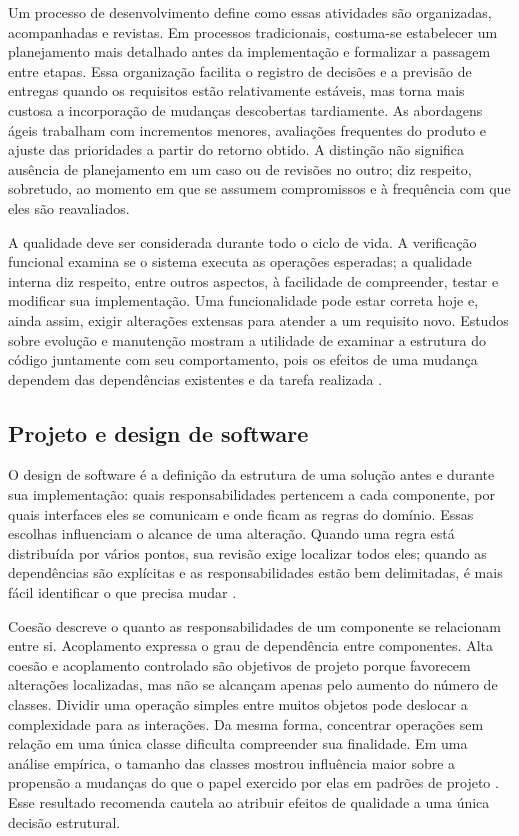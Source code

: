 \documentclass[12pt]{article}
\begin{document}
Um processo de desenvolvimento define como essas atividades são organizadas, acompanhadas e revistas. Em processos tradicionais, costuma-se estabelecer um planejamento mais detalhado antes da implementação e formalizar a passagem entre etapas. Essa organização facilita o registro de decisões e a previsão de entregas quando os requisitos estão relativamente estáveis, mas torna mais custosa a incorporação de mudanças descobertas tardiamente. As abordagens ágeis trabalham com incrementos menores, avaliações frequentes do produto e ajuste das prioridades a partir do retorno obtido. A distinção não significa ausência de planejamento em um caso ou de revisões no outro; diz respeito, sobretudo, ao momento em que se assumem compromissos e à frequência com que eles são reavaliados.

A qualidade deve ser considerada durante todo o ciclo de vida. A verificação funcional examina se o sistema executa as operações esperadas; a qualidade interna diz respeito, entre outros aspectos, à facilidade de compreender, testar e modificar sua implementação. Uma funcionalidade pode estar correta hoje e, ainda assim, exigir alterações extensas para atender a um requisito novo. Estudos sobre evolução e manutenção mostram a utilidade de examinar a estrutura do código juntamente com seu comportamento, pois os efeitos de uma mudança dependem das dependências existentes e da tarefa realizada \cite{prechelt2001,hsu2024}.

\subsection{Projeto e design de software}

O design de software é a definição da estrutura de uma solução antes e durante sua implementação: quais responsabilidades pertencem a cada componente, por quais interfaces eles se comunicam e onde ficam as regras do domínio. Essas escolhas influenciam o alcance de uma alteração. Quando uma regra está distribuída por vários pontos, sua revisão exige localizar todos eles; quando as dependências são explícitas e as responsabilidades estão bem delimitadas, é mais fácil identificar o que precisa mudar \cite{gamma1994}.

Coesão descreve o quanto as responsabilidades de um componente se relacionam entre si. Acoplamento expressa o grau de dependência entre componentes. Alta coesão e acoplamento controlado são objetivos de projeto porque favorecem alterações localizadas, mas não se alcançam apenas pelo aumento do número de classes. Dividir uma operação simples entre muitos objetos pode deslocar a complexidade para as interações. Da mesma forma, concentrar operações sem relação em uma única classe dificulta compreender sua finalidade. Em uma análise empírica, o tamanho das classes mostrou influência maior sobre a propensão a mudanças do que o papel exercido por elas em padrões de projeto \cite{posnett2011}. Esse resultado recomenda cautela ao atribuir efeitos de qualidade a uma única decisão estrutural.
\end{document}
